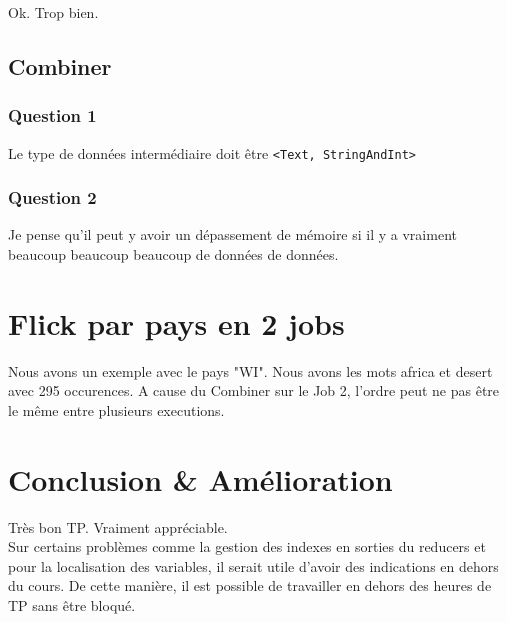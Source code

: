 \documentclass[a4paper,11pt]{article}
\begin{document}
Ok. Trop bien. 

\subsection{Combiner}

\subsubsection{Question 1}

Le type de données intermédiaire doit être \verb$<Text, StringAndInt>$

\subsubsection{Question 2}

Je pense qu'il peut y avoir un dépassement de mémoire si il y a vraiment beaucoup beaucoup beaucoup de données de données. 

\section{Flick par pays en 2 jobs}

Nous avons un exemple avec le pays "WI". Nous avons les mots africa et desert avec 295 occurences. A cause du Combiner sur le Job 2, l'ordre peut ne pas être le même entre plusieurs executions. 


\section{Conclusion \& Amélioration}

Très bon TP. Vraiment appréciable. \\
Sur certains problèmes comme la gestion des indexes en sorties du reducers et pour la localisation des variables, il serait utile d'avoir des indications en dehors du cours. De cette manière, il est possible de travailler en dehors des heures de TP sans être bloqué. 
\end{document}
